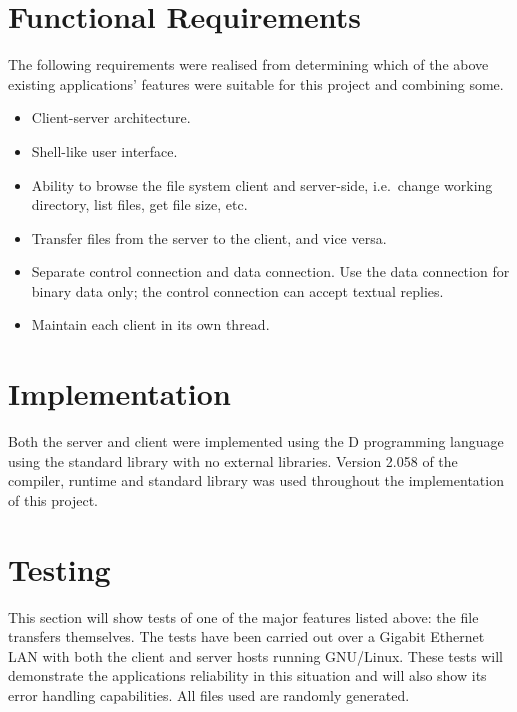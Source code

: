\documentclass[a4paper]{article}
\begin{document}
\section{Functional Requirements}

The following requirements were realised from determining which of the above existing applications' features were suitable for this project and combining some.

\begin{itemize}
 \item Client-server architecture.
 \item Shell-like user interface.
 \item Ability to browse the file system client and server-side, i.e.\ change working directory, list files, get file size, etc.
 \item Transfer files from the server to the client, and vice versa.
 \item Separate control connection and data connection. Use the data connection for binary data only; the control connection can accept textual replies.
 \item Maintain each client in its own thread.
\end{itemize}

\section{Implementation}

Both the server and client were implemented using the D programming language \cite{dlang} using the standard library with no external libraries. Version 2.058 of the compiler, runtime and standard library was used throughout the implementation of this project.

\section{Testing}

This section will show tests of one of the major features listed above: the file transfers themselves. The tests have been carried out over a Gigabit Ethernet LAN with both the client and server hosts running GNU/Linux. These tests will demonstrate the applications reliability in this situation and will also show its error handling capabilities. All files used are randomly generated.
\end{document}
